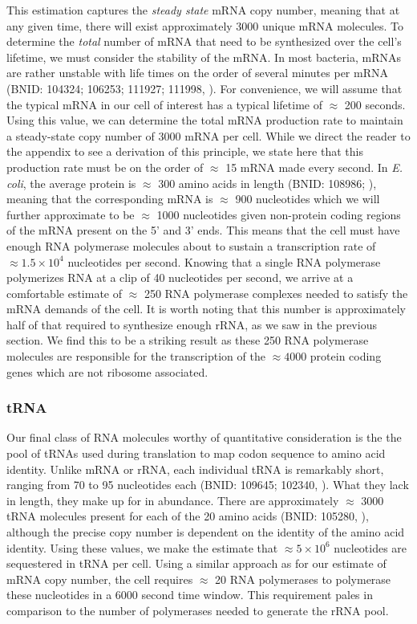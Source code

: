 This estimation captures the \textit{steady state} mRNA copy number, meaning
that at any given time, there will exist approximately 3000 unique mRNA
molecules. To determine the \textit{total} number of mRNA that need to be
synthesized over the cell's lifetime, we must consider the stability of the
mRNA. In most bacteria, mRNAs are rather unstable with life times on the order
of several minutes per mRNA (BNID: 104324; 106253; 111927; 111998,
\cite{milo2010}). For convenience, we will assume that the typical mRNA in our
cell of interest has a typical lifetime of $\approx$ 200 seconds. Using this
value, we can determine the total mRNA production rate to maintain a
steady-state copy number of 3000 mRNA per cell. While we direct the reader to
the appendix to see a derivation of this principle, we state here that this
production rate must be on the order of $\approx$ 15 mRNA made every second.  
In \textit{E. coli}, the average protein is $\approx$ 300 amino acids in length (BNID:
108986; \cite{milo2010}), meaning that the corresponding mRNA is $\approx$
900 nucleotides which we will further approximate to be $\approx$ 1000
nucleotides given non-protein coding regions of the mRNA present on the 5'
and 3' ends. This means that the cell must have enough RNA polymerase molecules
about to sustain a transcription rate of $\approx 1.5 \times 10^4$ nucleotides
per second. Knowing that a single RNA polymerase polymerizes RNA at a clip of 40
nucleotides per second, we arrive at a comfortable estimate of $\approx$ 250 RNA
polymerase complexes needed to satisfy the mRNA demands of the cell. It is worth
noting that this number is approximately half of that required to synthesize
enough rRNA, as we saw in the previous section. We find this to be a striking
result as these 250 RNA polymerase molecules are responsible for the
transcription of the $\approx 4000$ protein coding genes which are not ribosome
associated. 

\subsubsection{tRNA}
Our final class of RNA molecules worthy of quantitative consideration is the
the pool of tRNAs used during translation to map codon sequence to amino acid
identity. Unlike mRNA or rRNA, each individual tRNA is remarkably short,
ranging from 70 to 95 nucleotides each (BNID: 109645; 102340,
\cite{milo2010}). What they lack in length, they make up for in abundance.
There are approximately $\approx$ 3000 tRNA molecules present for each of the
20 amino acids (BNID: 105280, \cite{milo2010}), although the precise copy
number is dependent on the identity of the amino acid identity.  Using these
values, we make the estimate that $\approx 5 \times 10^6$ nucleotides are
sequestered in tRNA per cell. Using a similar approach as for our estimate of
mRNA copy number, the cell requires $\approx$ 20 RNA polymerases to polymerase
these nucleotides in a 6000 second time window. This requirement pales in comparison to the number of polymerases
needed to generate the rRNA pool.

